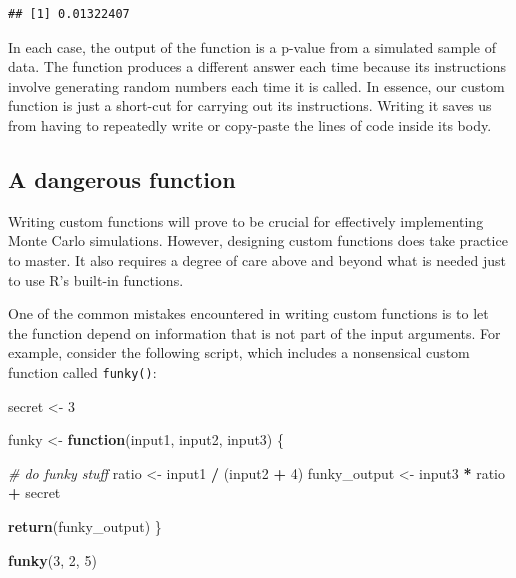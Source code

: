 \documentclass[
]{book}
\newenvironment{Shaded}{\begin{snugshade}}{\end{snugshade}}
\newcommand{\CommentTok}[1]{\textcolor[rgb]{0.56,0.35,0.01}{\textit{#1}}}
\newcommand{\ControlFlowTok}[1]{\textcolor[rgb]{0.13,0.29,0.53}{\textbf{#1}}}
\newcommand{\DecValTok}[1]{\textcolor[rgb]{0.00,0.00,0.81}{#1}}
\newcommand{\FunctionTok}[1]{\textcolor[rgb]{0.13,0.29,0.53}{\textbf{#1}}}
\newcommand{\NormalTok}[1]{#1}
\newcommand{\OtherTok}[1]{\textcolor[rgb]{0.56,0.35,0.01}{#1}}
\newcommand{\SpecialCharTok}[1]{\textcolor[rgb]{0.81,0.36,0.00}{\textbf{#1}}}
\begin{document}
\begin{verbatim}
## [1] 0.01322407
\end{verbatim}

In each case, the output of the function is a p-value from a simulated sample of data. The function produces a different answer each time because its instructions involve generating random numbers each time it is called.
In essence, our custom function is just a short-cut for carrying out its instructions.
Writing it saves us from having to repeatedly write or copy-paste the lines of code inside its body.

\subsection{A dangerous function}\label{a-dangerous-function}

Writing custom functions will prove to be crucial for effectively implementing Monte Carlo simulations.
However, designing custom functions does take practice to master.
It also requires a degree of care above and beyond what is needed just to use R's built-in functions.

One of the common mistakes encountered in writing custom functions is to let the function depend on information that is not part of the input arguments.
For example, consider the following script, which includes a nonsensical custom function called \texttt{funky()}:

\begin{Shaded}
\begin{Highlighting}[]
\NormalTok{secret }\OtherTok{\textless{}{-}} \DecValTok{3}

\NormalTok{funky }\OtherTok{\textless{}{-}} \ControlFlowTok{function}\NormalTok{(input1, input2, input3) \{}
  
  \CommentTok{\# do funky stuff}
\NormalTok{  ratio }\OtherTok{\textless{}{-}}\NormalTok{ input1 }\SpecialCharTok{/}\NormalTok{ (input2 }\SpecialCharTok{+} \DecValTok{4}\NormalTok{)}
\NormalTok{  funky\_output }\OtherTok{\textless{}{-}}\NormalTok{ input3 }\SpecialCharTok{*}\NormalTok{ ratio }\SpecialCharTok{+}\NormalTok{ secret}
  
  \FunctionTok{return}\NormalTok{(funky\_output)  }
\NormalTok{\}}

\FunctionTok{funky}\NormalTok{(}\DecValTok{3}\NormalTok{, }\DecValTok{2}\NormalTok{, }\DecValTok{5}\NormalTok{)}
\end{Highlighting}
\end{Shaded}
\end{document}
